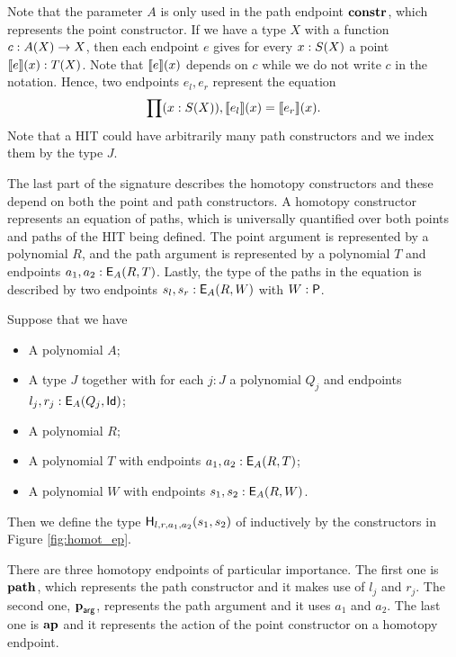 Note that the parameter $A$ is only used in the path endpoint $\operatorname{\mathbf{constr}}$, which represents the point constructor.
If we have a type $X$ with a function $c : A(X) \rightarrow X$,
then each endpoint $e$ gives for every $x : S(X)$ a point $\llbracket e \rrbracket(x) : T(X)$.
Note that $\llbracket e \rrbracket(x)$ depends on $c$ while we do not write $c$ in the notation.
Hence, two endpoints $e_l, e_r$ represent the equation
\[
\prod (x : S(X)) , \llbracket e_l \rrbracket(x) = \llbracket e_r \rrbracket(x).
\]
Note that a HIT could have arbitrarily many path constructors and we index them by the type $J$.

The last part of the signature describes the homotopy constructors
and these depend on both the point and path constructors.
A homotopy constructor represents an equation of paths, which is universally quantified over both points and paths of
the HIT being defined.
The point argument is represented by a polynomial $R$, and the path argument is represented by a polynomial $T$ and endpoints $a_1, a_2 : \mathsf{E}_{A}(R,T)$.
Lastly, the type of the paths in the equation is described by two endpoints $s_l, s_r : \mathsf{E}_{A}(R,W)$ with $W : \mathsf{P}$.

\begin{definition}
Suppose that we have
\begin{itemize}
	\item A polynomial $A$;
	\item A type $J$ together with for each $j : J$ a polynomial $Q_j$ and endpoints $l_j, r_j : \mathsf{E}_{A}(Q_j,\mathsf{Id})$;
	\item A polynomial $R$;
	\item A polynomial $T$ with endpoints $a_1, a_2 : \mathsf{E}_{A}(R,T)$;
	\item A polynomial $W$ with endpoints $s_1, s_2 : \mathsf{E}_{A}(R,W)$.
\end{itemize}
Then we define the type $\mathsf{H}_{l,r,a_1,a_2}(s_1, s_2)$ of  inductively by the constructors in Figure \ref{fig:homot_ep}.
\end{definition}

There are three homotopy endpoints of particular importance.
The first one is $\operatorname{\mathbf{path}}$, which represents the path constructor and it makes use of $l_j$ and $r_j$.
The second one, $\operatorname{\mathbf{p}}_{\mathsf{arg}}$, represents the path argument and it uses $a_1$ and $a_2$.
The last one is $\operatorname{\mathbf{ap}}$ and it represents the action of the point constructor on a homotopy endpoint.

